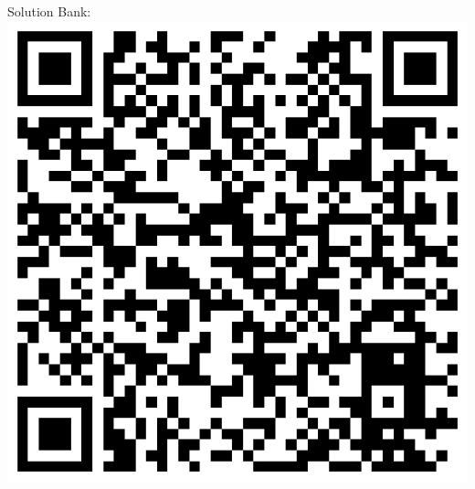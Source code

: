 \documentclass[fleqn, twoside]{article}
\begin{document}
\begin{minipage}[b]{.13\textwidth}
    \sffamily
    Solution Bank:
    \vspace{1mm}\linebreak
    \includegraphics[width=1.1\textwidth, valign=b]{images/link-to-y1-sol-bank}
\end{minipage}

\newpage
\pagestyle{attribution}
\end{document}
